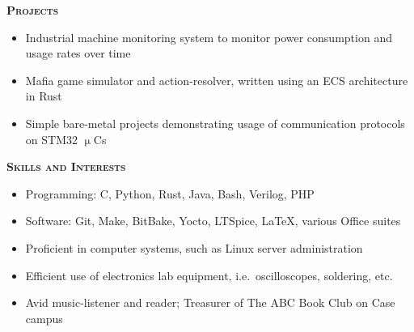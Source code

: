 \documentclass[12pt]{article}
\newcommand*{\titlefont}{\fontfamily{pnc}\selectfont}
\begin{document}
\vspace{-\topsep}

\bigbreak{}

{\titlefont\large\textsc{\textbf{Projects}}}
\hrulefill{}\\
%
\vspace{-\topsep}
\begin{itemize}
    \setlength{\parskip}{0pt}
    \setlength{\itemsep}{0pt plus 1pt}
    \item Industrial machine monitoring system to monitor power consumption and usage rates over time
    \item Mafia game simulator and action-resolver, written using an ECS architecture in Rust
    \item Simple bare-metal projects demonstrating usage of communication protocols on STM32 $\upmu$Cs
\end{itemize}

\bigbreak{}

{\titlefont\large\textsc{\textbf{Skills and Interests}}}
\hrulefill{}\\
%
\vspace{-\topsep}
\begin{itemize}
    \setlength{\parskip}{0pt}
    \setlength{\itemsep}{0pt plus 1 pt}
    \item Programming: C, Python, Rust, Java, Bash, Verilog, PHP
    \item Software: Git, Make, BitBake, Yocto, LTSpice, LaTeX, various Office suites
    \item Proficient in computer systems, such as Linux server administration
    \item Efficient use of electronics lab equipment, i.e.\ oscilloscopes, soldering, etc.
    \item Avid music-listener and reader; Treasurer of The ABC Book Club on Case campus

\end{itemize}
\end{document}
